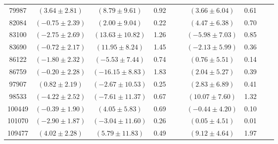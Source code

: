 \documentclass [10pt, twoside] {uwthesis}[2012/04/02]
\begin{document}
{\begin{longtable}[t]{|c|c|cccc|cccc|}
79987	&  $(	3.64	  \pm  	2.81	)$  &  $(	8.79	  \pm  	9.61	)$  &  	0.92	  &  		  &  		  &  $(	3.66	  \pm  	6.04	)$  &  	0.61	  &  		  &  		  \\
82084	&  $(	-0.75	  \pm  	2.39	)$  &  $(	2.00	  \pm  	9.04	)$  &  	0.22	  &  		  &  		  &  $(	4.47	  \pm  	6.38	)$  &  	0.70	  &  		  &  		  \\
83100	&  $(	-2.75	  \pm  	2.69	)$  &  $(	13.63	  \pm  	10.82	)$  &  	1.26	  &  		  &  		  &  $(	-5.98	  \pm  	7.03	)$  &  	0.85	  &  		  &  		  \\
83690	&  $(	-0.72	  \pm  	2.17	)$  &  $(	11.95	  \pm  	8.24	)$  &  	1.45	  &  		  &  		  &  $(	-2.13	  \pm  	5.99	)$  &  	0.36	  &  		  &  		  \\
86122	&  $(	-1.80	  \pm  	2.32	)$  &  $(	-5.53	  \pm  	7.44	)$  &  	0.74	  &  		  &  		  &  $(	0.76	  \pm  	5.51	)$  &  	0.14	  &  		  &  		  \\
86759	&  $(	-0.20	  \pm  	2.28	)$  &  $(	-16.15	  \pm  	8.83	)$  &  	1.83	  &  		  &  		  &  $(	2.04	  \pm  	5.27	)$  &  	0.39	  &  		  &  		  \\
97907	&  $(	0.82	  \pm  	2.19	)$  &  $(	-2.67	  \pm  	10.53	)$  &  	0.25	  &  		  &  		  &  $(	2.83	  \pm  	6.89	)$  &  	0.41	  &  		  &  		  \\
98533	&  $(	-4.22	  \pm  	2.52	)$  &  $(	-7.61	  \pm  	11.37	)$  &  	0.67	  &  		  &  		  &  $(	10.07	  \pm  	7.60	)$  &  	1.32	  &  		  &  		  \\
100449	&  $(	-0.39	  \pm  	1.90	)$  &  $(	4.05	  \pm  	5.83	)$  &  	0.69	  &  		  &  		  &  $(	-0.44	  \pm  	4.20	)$  &  	0.10	  &  		  &  		  \\
101070	&  $(	-2.90	  \pm  	1.87	)$  &  $(	-3.04	  \pm  	11.60	)$  &  	0.26	  &  		  &  		  &  $(	0.05	  \pm  	4.51	)$  &  	0.01	  &  		  &  		  \\
109477	&  $(	4.02	  \pm  	2.28	)$  &  $(	5.79	  \pm  	11.83	)$  &  	0.49	  &  		  &  		  &  $(	9.12	  \pm  	4.64	)$  &  	1.97	  &  		  &  		  \\  \hline 
\end{longtable}
}

\newpage
\end{document}
